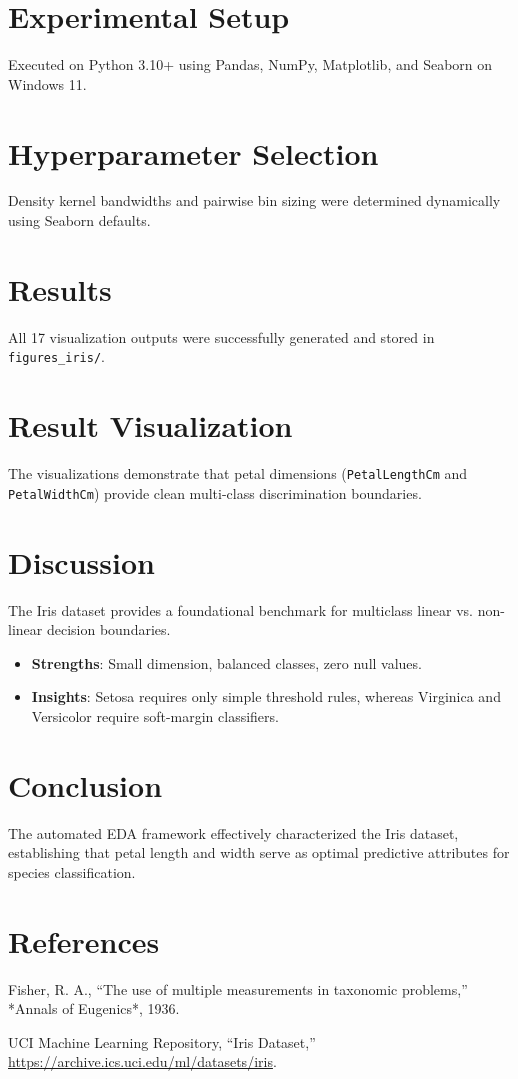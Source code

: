 \documentclass[12pt,a4paper]{article}
\begin{document}
\section{Experimental Setup}
Executed on Python 3.10+ using Pandas, NumPy, Matplotlib, and Seaborn on Windows 11.

\section{Hyperparameter Selection}
Density kernel bandwidths and pairwise bin sizing were determined dynamically using Seaborn defaults.

\section{Results}
All 17 visualization outputs were successfully generated and stored in \texttt{figures\_iris/}.

\section{Result Visualization}
The visualizations demonstrate that petal dimensions (\texttt{PetalLengthCm} and \texttt{PetalWidthCm}) provide clean multi-class discrimination boundaries.

\section{Discussion}
The Iris dataset provides a foundational benchmark for multiclass linear vs. non-linear decision boundaries.
\begin{itemize}[noitemsep]
    \item \textbf{Strengths}: Small dimension, balanced classes, zero null values.
    \item \textbf{Insights}: Setosa requires only simple threshold rules, whereas Virginica and Versicolor require soft-margin classifiers.
\end{itemize}

\section{Conclusion}
The automated EDA framework effectively characterized the Iris dataset, establishing that petal length and width serve as optimal predictive attributes for species classification.

\section{References}
\begin{enumerate}[label={[\arabic*]}, leftmargin=2em]
    \item Fisher, R. A., ``The use of multiple measurements in taxonomic problems,'' *Annals of Eugenics*, 1936.
    \item UCI Machine Learning Repository, ``Iris Dataset,'' \url{https://archive.ics.uci.edu/ml/datasets/iris}.
\end{enumerate}
\end{document}
